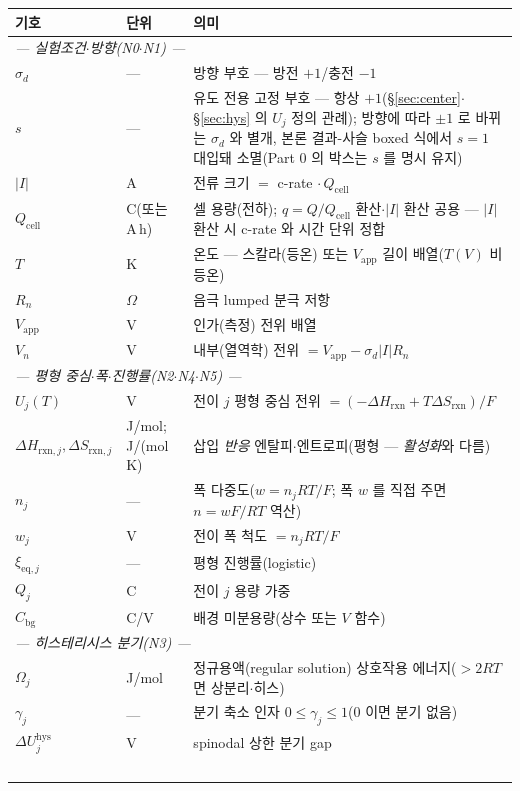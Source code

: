 \documentclass[11pt,a4paper]{article}
\newcommand{\eq}{\mathrm{eq}}
\newcommand{\app}{\mathrm{app}}
\newcommand{\cell}{\mathrm{cell}}
\newcommand{\bg}{\mathrm{bg}}
\newcommand{\rxn}{\mathrm{rxn}}
\newcommand{\hys}{\mathrm{hys}}
\begin{document}
\begin{longtable}{p{} p{} p{}}
\toprule 기호 & 단위 & 의미 \\ \midrule \endhead
\multicolumn{3}{l}{\emph{— 실험조건$\cdot$방향(N0$\cdot$N1) —}}\\
$\sigma_d$ & --- & 방향 부호 — 방전 $+1$/충전 $-1$ \\
$s$ & --- & 유도 전용 고정 부호 — 항상 $+1$(\S\ref{sec:center}$\cdot$\S\ref{sec:hys} 의 $U_j$ 정의 관례); 방향에 따라 $\pm1$ 로 바뀌는 $\sigma_d$ 와 별개, 본론 결과-사슬 boxed 식에서 $s{=}1$ 대입돼 소멸(Part 0 의 박스는 $s$ 를 명시 유지) \\
$|I|$ & A & 전류 크기 $=$ c-rate$\,\cdot Q_\cell$ \\
$Q_\cell$ & C(또는 A\,h) & 셀 용량(전하); $q=Q/Q_\cell$ 환산$\cdot$$|I|$ 환산 공용 — $|I|$ 환산 시 c-rate 와 시간 단위 정합 \\
$T$ & K & 온도 — 스칼라(등온) 또는 $V_\app$ 길이 배열($T(V)$ 비등온) \\
$R_n$ & $\Omega$ & 음극 lumped 분극 저항 \\
$V_\app$ & V & 인가(측정) 전위 배열 \\
$V_n$ & V & 내부(열역학) 전위 $=V_\app-\sigma_d|I|R_n$ \\
\multicolumn{3}{l}{\emph{— 평형 중심$\cdot$폭$\cdot$진행률(N2$\cdot$N4$\cdot$N5) —}}\\
$U_j(T)$ & V & 전이 $j$ 평형 중심 전위 $=(-\Delta H_\rxn+T\Delta S_\rxn)/F$ \\
$\Delta H_{\rxn,j},\Delta S_{\rxn,j}$ & {\footnotesize J/mol;\,J/(mol\,K)} & 삽입 \emph{반응} 엔탈피$\cdot$엔트로피(평형 — \emph{활성화}와 다름) \\
$n_j$ & --- & 폭 다중도($w=n_jRT/F$; 폭 $w$ 를 직접 주면 $n=wF/RT$ 역산) \\
$w_j$ & V & 전이 폭 척도 $=n_jRT/F$ \\
$\xi_{\eq,j}$ & --- & 평형 진행률(logistic) \\
$Q_j$ & C & 전이 $j$ 용량 가중 \\
$C_\bg$ & C/V & 배경 미분용량(상수 또는 $V$ 함수) \\
\multicolumn{3}{l}{\emph{— 히스테리시스 분기(N3) —}}\\
$\Omega_j$ & J/mol & 정규용액(regular solution) 상호작용 에너지($>2RT$ 면 상분리$\cdot$히스) \\
$\gamma_j$ & --- & 분기 축소 인자 $0\le\gamma_j\le1$($0$ 이면 분기 없음) \\
$\Delta U_j^\hys$ & V & spinodal 상한 분기 gap \\
$$
\end{longtable}
\end{document}
